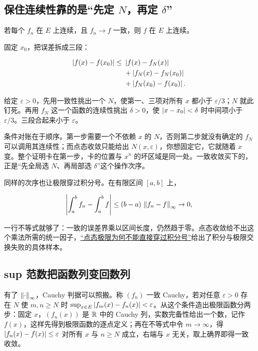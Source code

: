 \subsection{保住连续性靠的是``先定 \(N\)，再定 \(\delta\)''}

\begin{theorem}
若每个 \(f_n\) 在 \(E\) 上连续，且 \(f_n\to f\) 一致，则 \(f\) 在 \(E\) 上连续。
\end{theorem}

固定 \(x_0\)，把误差拆成三段：

\[
\begin{aligned}
\left|f(x)-f(x_0)\right| \le\ & \left|f(x)-f_N(x)\right|\\
& + \left|f_N(x)-f_N(x_0)\right|\\
& + \left|f_N(x_0)-f(x_0)\right|.
\end{aligned}
\]

给定 \(\varepsilon>0\)，先用一致性挑出一个 \(N\)，使第一、三项对所有 \(x\) 都小于 \(\varepsilon/3\)；\(N\) 就此钉死。再用 \(f_N\) 这一个函数的连续性挑出 \(\delta>0\)，使 \(\left|x-x_0\right|<\delta\) 时中间项小于 \(\varepsilon/3\)。三段合起来小于 \(\varepsilon\)。

条件对账在于顺序。第一步需要一个不依赖 \(x\) 的 \(N\)，否则第二步就没有确定的 \(f_N\) 可以调用其连续性；而点态收敛只能给出 \(N(x,\varepsilon)\)，你想固定它，它就随着 \(x\) 变。整个证明卡在第一步，卡的位置与 \(x^n\) 的坏区域是同一处。一致收敛买下的，正是``先全局选 \(N\)、再局部选 \(\delta\)''这个操作次序。

同样的次序也让极限穿过积分号。在有限区间 \([a,b]\) 上，

\[
\left|\int_a^b f_n - \int_a^b f\right| \le (b-a)\,\left\lVert f_n-f\right\rVert_\infty \to 0,
\]

一行不等式就够了：一致的误差界乘以区间长度，仍然趋于零。点态收敛给不出这个乘法所需的统一因子，\hyperref[sec:12-Real-Analysis-Support/04-Limits-and-Integration/01]{``点态极限为何不能直接穿过积分号''}给出了积分与极限交换失败的具体样本。

\subsection{sup 范数把函数列变回数列}

有了 \(\left\lVert\cdot\right\rVert_\infty\)，Cauchy 判据可以照搬。称 \((f_n)\) 一致 Cauchy，若对任意 \(\varepsilon>0\) 存在 \(N\) 使 \(m,n\ge N\) 时 \(\sup_{x\in E}\left|f_m(x)-f_n(x)\right|<\varepsilon\)。从这个条件造出极限函数分两步：固定 \(x\)，\((f_n(x))\) 是 \(\mathbb{R}\) 中的 Cauchy 列，实数完备性给出一个数，记作 \(f(x)\)，这样先得到极限函数的逐点定义；再在不等式中令 \(m\to\infty\)，得 \(\left|f_n(x)-f(x)\right|\le\varepsilon\) 对所有 \(x\) 与 \(n\ge N\) 成立，右端与 \(x\) 无关，取上确界即得一致收敛。

